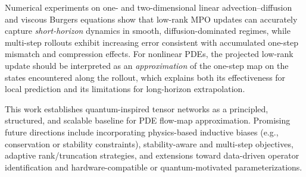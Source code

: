 \documentclass[letterpaper, 10 pt, conference]{ieeeconf}  %
\begin{document}
Numerical experiments on one- and two-dimensional linear advection--diffusion
and viscous Burgers equations show that low-rank MPO updates can accurately
capture \emph{short-horizon} dynamics in smooth, diffusion-dominated regimes,
while multi-step rollouts exhibit increasing error consistent with accumulated
one-step mismatch and compression effects. For nonlinear PDEs, the projected
low-rank update should be interpreted as an \emph{approximation} of the one-step
map on the states encountered along the rollout, which explains both its
effectiveness for local prediction and its limitations for long-horizon
extrapolation.

This work establishes quantum-inspired tensor networks as a principled,
structured, and scalable baseline for PDE flow-map approximation. Promising
future directions include incorporating physics-based inductive biases (e.g.,
conservation or stability constraints), stability-aware and multi-step objectives,
adaptive rank/truncation strategies, and extensions toward data-driven operator
identification and hardware-compatible or quantum-motivated parameterizations.




\end{document}
